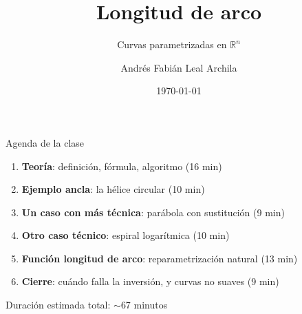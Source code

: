 \documentclass[11pt,aspectratio=169]{beamer}
\title{Longitud de arco}
\subtitle{Curvas parametrizadas en $\mathbb{R}^n$}
\author{Andrés Fabián Leal Archila}
\institute{Cálculo III (Multivariable) --- Cód. 20254}
\date{\today}
\begin{document}
\portada
\begin{frame}{Agenda de la clase}
  \begin{enumerate}
    \setlength{\itemsep}{10pt}
    \item \textbf{Teoría}: definición, fórmula, algoritmo \hfill {\small\color{gray60}(16 min)}
    \item \textbf{Ejemplo ancla}: la hélice circular \hfill {\small\color{gray60}(10 min)}
    \item \textbf{Un caso con más técnica}: parábola con sustitución \hfill {\small\color{gray60}(9 min)}
    \item \textbf{Otro caso técnico}: espiral logarítmica \hfill {\small\color{gray60}(10 min)}
    \item \textbf{Función longitud de arco}: reparametrización natural \hfill {\small\color{gray60}(13 min)}
    \item \textbf{Cierre}: cuándo falla la inversión, y curvas no suaves \hfill {\small\color{gray60}(9 min)}
  \end{enumerate}
  \vfill
  \begin{center}
    \small\color{gray60} Duración estimada total: $\sim$67 minutos
  \end{center}
\end{frame}

\end{document}

